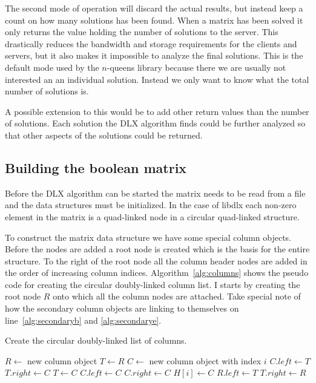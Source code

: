 The second mode of operation will discard the actual results, but instead keep a count on how many solutions has been found.
When a matrix has been solved it only returns the value holding the number of solutions to the server.
This drastically reduces the bandwidth and storage requirements for the clients and servers, but it also makes it impossible to analyze the final solutions.
This is the default mode used by the $n$-queens library because there we are usually not interested an an individual solution.
Instead we only want to know what the total number of solutions is.

A possible extension to this would be to add other return values than the number of solutions.
Each solution the DLX algorithm finds could be further analyzed so that other aspects of the solutions could be returned.



\subsection{Building the boolean matrix}
\label{matrix_construction}

Before the DLX algorithm can be started the matrix needs to be read from a file and the data structures must be initialized.
In the case of libdlx each non-zero element in the matrix is a quad-linked node in a circular quad-linked structure.

To construct the matrix data structure we have some special column objects.
Before the nodes are added a root node is created which is the basis for the entire structure.
To the right of the root node all the column header nodes are added in the order of increasing column indices.
Algorithm~\ref{alg:columns} shows the pseudo code for creating the circular doubly-linked column list.
I starts by creating the root node $R$ onto which all the column nodes are attached.
Take special note of how the secondary column objects are linking to themselves on line~\ref{alg:secondaryb} and \ref{alg:secondarye}.

\begin{algorithm}[H]
	\caption{Create the circular doubly-linked list of columns.}
	\label{alg:columns}
	\begin{distribalgo}[1]
		\STATE $R \leftarrow$ new column object
		\STATE $T \leftarrow R$
			\STATE $C \leftarrow$ new column object with index $i$
				\STATE $C.left \leftarrow T$
				\STATE $T.right \leftarrow C$
				\STATE $T \leftarrow C$
			\ELSE
				\STATE $C.left \leftarrow C$  \label{alg:secondaryb}
				\STATE $C.right \leftarrow C$  \label{alg:secondarye}
			\ENDIF
			\STATE $H[i] \leftarrow C$
		\ENDFOR
		\STATE $R.left \leftarrow T$
		\STATE $T.right \leftarrow R$
	\end{distribalgo}
\end{algorithm}

